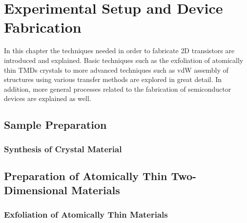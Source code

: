 \graphicspath{{./figs/chap2/}} %

\chapter{Experimental Setup and Device Fabrication}\label{chap:two}
In this chapter the techniques needed in order to fabricate \ac{2D} transistors
are introduced and explained. Basic techniques such as the exfoliation of atomically thin \acp{TMD} crystals 
to more advanced techniques such as \ac{vdW} assembly of structures using various transfer methods are explored
in great detail. In addition, more general processes related to the fabrication of semiconductor devices
are explained as well. 
\section{Sample Preparation}\label{sec:sample_prep}

\subsection{Synthesis of Crystal Material}\label{subsec:crystal_synthesis}

\section{Preparation of Atomically Thin Two-Dimensional Materials}\label{sec:prep_of_samples}

\subsection{Exfoliation of Atomically Thin Materials}\label{subsec:exfoliation}

